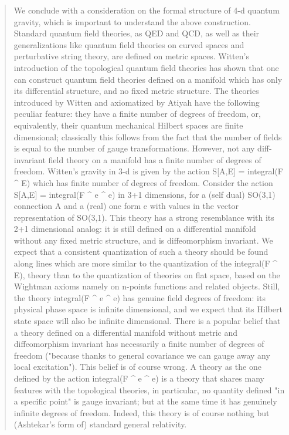 \begin{quote}
We conclude with a consideration on the formal structure of 4-d quantum
gravity, which is important to understand the above construction.  Standard
quantum field theories, as QED and QCD, as well as their generalizations like
quantum field theories on curved spaces and perturbative string theory, are
defined on metric spaces.  Witten's introduction of the topological quantum
field theories has shown that one can construct quantum field theories
defined on a manifold which has only its differential structure, and no fixed
metric structure. The theories introduced by Witten and axiomatized by
Atiyah have the following peculiar feature: they have a finite number of
degrees of freedom, or, equivalently, their quantum mechanical Hilbert
spaces are finite dimensional; classically this follows from the fact that
the number of fields is equal to the number of gauge transformations. However,
not any diff-invariant field theory on a manifold has a finite number of
degrees of freedom.  Witten's gravity in 3-d is given by the action 
                S[A,E] = integral(F ^ E)
which has finite number of degrees of freedom. Consider the action
              S[A,E] =  integral(F ^ e ^ e)
in 3+1 dimensions, for a (self dual) SO(3,1) connection A and a (real)
one form e with values in the vector representation of
SO(3,1). This theory has a strong resemblance with its 2+1 dimensional
analog: it is still defined on a differential manifold without any fixed
metric structure, and is diffeomorphism invariant.  We expect that a
consistent quantization of such a theory should be found along lines
which are more similar to the quantization of the integral(F ^ E),
theory than to the quantization of theories on flat space, based on the
Wightman axioms namely on n-points functions and related objects.
Still, the theory integral(F ^ e ^ e) has genuine field
degrees of freedom: its physical phase space is infinite dimensional, and we
expect that its Hilbert state space will also be infinite dimensional.  There
is a popular belief that a theory defined on a differential manifold
without metric and diffeomorphism invariant has necessarily a finite
number of degrees of freedom ("because thanks to general covariance
we can gauge away any local excitation"). This belief is of course wrong.  A
theory as the one defined by the action integral(F ^ e ^ e) 
is a theory that shares many features with the topological theories, in
particular, no quantity defined "in a specific point" is gauge
invariant; but at the same time it has genuinely infinite degrees of
freedom.  Indeed, this theory is of course nothing but (Ashtekar's
form of) standard general relativity.


\end{quote}

